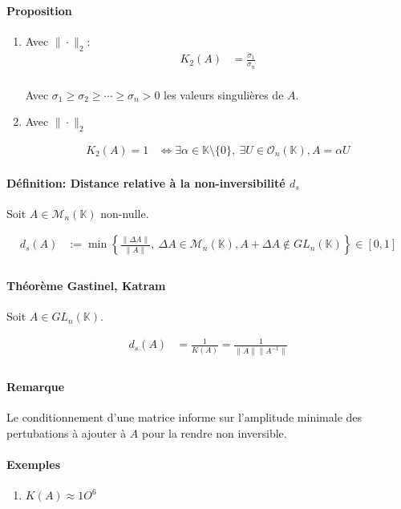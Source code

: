 \documentclass{article}
\newcommand{\cM}{\mathcal{M}}
\newcommand{\cO}{\mathcal{O}}
\newcommand{\K}{\mathbb{K}}
\newenvironment{theorem}[1][\unskip]{
	\paragraph{Théorème #1}

}{}
\newenvironment{remarque}{
	\paragraph{Remarque}
}{}
\newenvironment{proposition}[1][\unskip]{
	\paragraph{Proposition #1}

}{}
\newenvironment{definition}[1][\unskip]{
	\paragraph{Définition: #1}

}{}
\begin{document}
\begin{example}
\begin{proposition}
\begin{enumerate}
        \item Avec $\| \cdot \|_2$:
            \begin{align*}
                K_2(A) &= \frac{\sigma_1}{\sigma_n} \\
            \end{align*}

            Avec $\sigma_1 \ge \sigma_2 \ge \cdots \ge \sigma_n > 0$ les valeurs singulières de $A$.
        \item Avec $\| \cdot \|_2$ 

            \begin{align*}
                K_2(A) = 1 &\iff \exists \alpha\in \K \setminus \{0\},\  \exists U\in \cO_n(\K), A = \alpha U
            \end{align*}
    \end{enumerate}
\end{proposition}

\begin{definition}[Distance relative à la non-inversibilité $d_s$]
    

    Soit $A\in \cM_n(\K)$ non-nulle.

    
    \begin{align*}
        d_s(A) &:= \min \left\{\frac{\|\Delta A\|}{\|A\|},\ \Delta A \in \cM_n(\K), A + \Delta A \not\in GL_n(\K)\right\} \in [0, 1] \\
    \end{align*}
\end{definition}

\begin{theorem}[Gastinel, Katram]
    Soit $A\in GL_n(\K)$.

    \begin{align*}
        d_s(A) &= \frac{1}{K(A)} = \frac{1}{\|A\| \|A^{-1}\|} \\
    \end{align*}
\end{theorem}

\begin{remarque}
    Le conditionnement d'une matrice informe sur l'amplitude minimale des pertubations à ajouter à $A$ pour la rendre non inversible.

    \paragraph{Exemples}
    \begin{enumerate}
        \item $K(A) \approx 1O^{6}$
    \end{enumerate}
    

\end{remarque}
\end{example}
\end{document}
